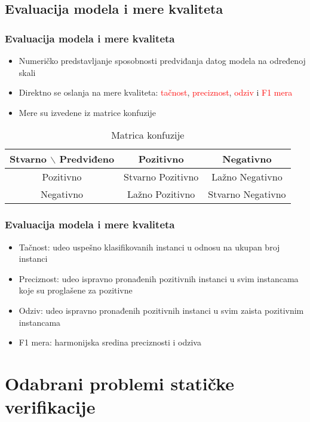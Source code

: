 \documentclass[11pt]{beamer}
\theoremstyle{definition}
\begin{document}
\subsection{Evaluacija modela i mere kvaliteta}
\begin{frame}
\frametitle{Evaluacija modela i mere kvaliteta}
\begin{itemize}
\item Numeričko predstavljanje sposobnosti predviđanja datog modela na određenoj skali
\item Direktno se oslanja na mere kvaliteta: \textcolor{red}{tačnost}, \textcolor{red}{preciznost}, \textcolor{red}{odziv} i \textcolor{red}{F1 mera}
\item Mere su izvedene iz matrice konfuzije
\end{itemize}

\begin{table}[h]
	\centering
	\begin{tabular}{ |c|cc| }
		\hline
		Stvarno $\backslash$  Predviđeno & Pozitivno & Negativno \\
		\hline
		Pozitivno & Stvarno Pozitivno & Lažno Negativno \\
		Negativno & Lažno Pozitivno & Stvarno Negativno \\
		\hline
	\end{tabular}
	\caption{Matrica konfuzije}
	\label{table:matrica_konfuzije}
\end{table}

\end{frame}

\begin{frame}
\frametitle{Evaluacija modela i mere kvaliteta}
\begin{itemize}
\item Tačnost: udeo uspešno klasifikovanih instanci u odnosu na ukupan broj instanci
\item Preciznost: udeo ispravno pronađenih pozitivnih instanci u svim instancama koje su proglašene za pozitivne
\item Odziv: udeo ispravno pronađenih pozitivnih instanci u svim zaista pozitivnim instancama
\item F1 mera: harmonijska sredina preciznosti i odziva
\end{itemize}
\end{frame}

\section{Odabrani problemi statičke verifikacije}
\label{sec:naslovN}
\end{document}
